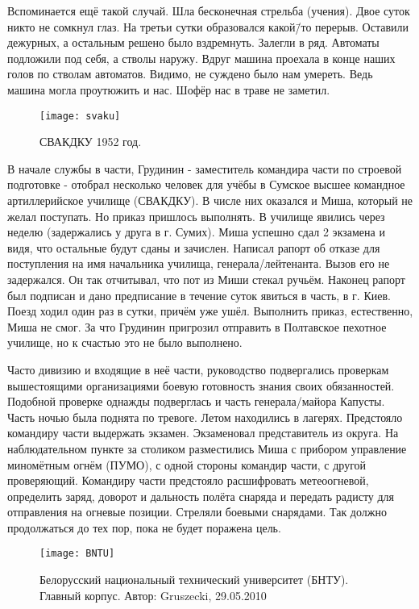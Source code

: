 Вспоминается ещё такой случай. Шла бесконечная стрельба (учения). Двое суток никто не сомкнул глаз. На третьи сутки образовался какой\=/то перерыв. Оставили дежурных, а остальным решено было вздремнуть. Залегли в ряд. Автоматы подложили под себя, а стволы наружу. Вдруг машина проехала в конце наших голов по стволам автоматов. Видимо, не суждено было нам умереть. Ведь машина могла проутюжить и нас. Шофёр нас в траве не заметил.

\begin{wrapfigure}{O}{.4\textwidth}
\centering
\texttt{[image: svaku]}
\caption[СВАКДКУ 1952 год.]{СВАКДКУ 1952 год\footnotemark.}
\label{fig:svaku}
\end{wrapfigure}

В начале службы в части, Грудинин - заместитель командира части по строевой подготовке - отобрал несколько человек для учёбы в Сумское высшее командное артиллерийское училище (СВАКДКУ). В числе них оказался и Миша, который не желал поступать. Но приказ пришлось выполнять. В училище явились через неделю (задержались у друга в г. Сумих). Миша успешно сдал 2 экзамена и видя, что остальные будут сданы и зачислен. Написал рапорт об отказе для поступления на имя начальника училища, генерала\-/лейтенанта. Вызов его не задержался. Он так отчитывал, что пот из Миши стекал ручьём. Наконец рапорт был подписан и дано предписание в течение суток явиться в часть, в г. Киев. Поезд ходил один раз в сутки, причём уже ушёл. Выполнить приказ, естественно, Миша не смог. За что Грудинин пригрозил отправить в Полтавское пехотное училище, но к счастью это не было выполнено. 

Часто дивизию и входящие в неё части, руководство подвергались проверкам вышестоящими организациями боевую готовность знания своих обязанностей. Подобной проверке однажды подверглась и часть генерала\-/майора Капусты. Часть ночью была поднята по тревоге. Летом находились в лагерях. Предстояло командиру части выдержать экзамен. Экзаменовал представитель из округа. На наблюдательном пункте за столиком разместились Миша с прибором управление миномётным огнём (ПУМО), с одной стороны командир части, с другой проверяющий. Командиру части предстояло расшифровать метеоогневой, определить заряд, доворот и дальность полёта снаряда и передать радисту для отправления на огневые позиции. Стреляли боевыми снарядами. Так должно продолжаться до тех пор, пока не будет поражена цель. 

\begin{wrapfigure}{O}{.4\textwidth}
\centering
\texttt{[image: BNTU]}
\caption{Белорусский национальный технический университет (БНТУ). Главный корпус. Автор: Gruszecki, 29.05.2010}
\label{fig:BNTU}
\end{wrapfigure}

